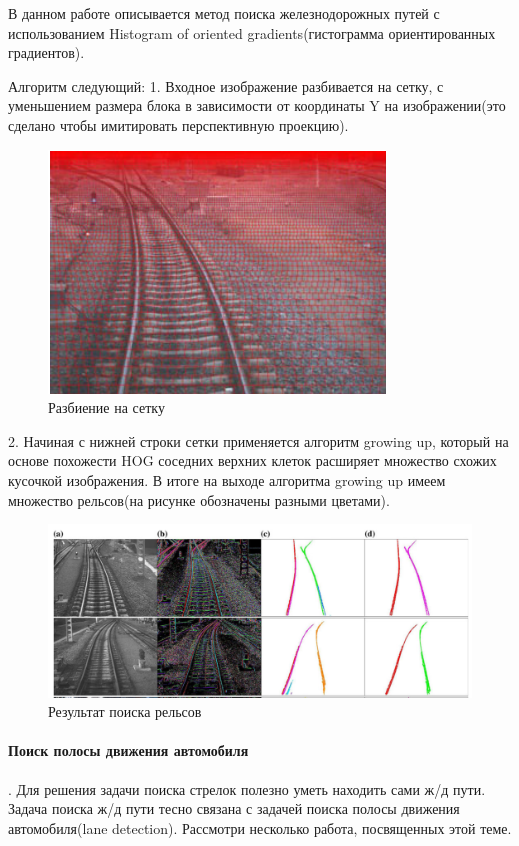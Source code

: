 В данном работе описывается метод поиска железнодорожных путей с использованием Histogram of oriented gradients\cite{b:HOG}(гистограмма ориентированных градиентов).

Алгоритм следующий:
1. Входное изображение разбивается на сетку, с уменьшением размера блока в зависимости от координаты Y на изображении(это сделано чтобы имитировать перспективную проекцию).
\begin{figure}[!h]
	\centering
	\includegraphics[width=0.5\linewidth]{pictures/screenshot009}
	\caption{Разбиение на сетку}
	\label{fig:screenshot009}
\end{figure}

2. Начиная с нижней строки сетки применяется алгоритм growing up, который на основе похожести HOG соседних верхних клеток расширяет множество схожих кусочкой изображения.
В итоге на выходе алгоритма growing up имеем множество рельсов(на рисунке обозначены разными цветами).
\begin{figure}[!h]
	\centering
	\includegraphics[width=1\linewidth]{pictures/screenshot010}
	\caption{Результат поиска рельсов}
	\label{fig:screenshot010}
\end{figure}
\newpage
\paragraph{Поиск полосы движения автомобиля \cite{b:lane_detection}}.
Для решения задачи поиска стрелок полезно уметь находить сами ж/д пути.
Задача поиска ж/д пути тесно связана с задачей поиска полосы движения автомобиля(lane detection). Рассмотри несколько работа, посвященных этой теме.

